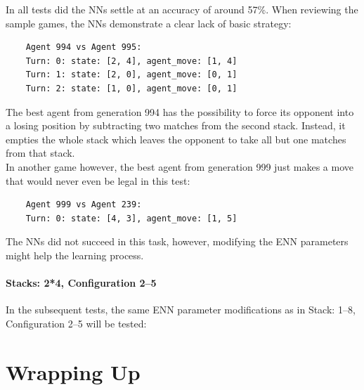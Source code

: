 \documentclass[11pt]{report}
\begin{document}
\begin{enumerate}
    In all tests did the NNs settle at an accuracy of around 57\%.
    When reviewing the sample games, the NNs demonstrate a clear lack of basic strategy:
    \begin{verbatim}
    Agent 994 vs Agent 995:
    Turn: 0: state: [2, 4], agent_move: [1, 4]
    Turn: 1: state: [2, 0], agent_move: [0, 1]
    Turn: 2: state: [1, 0], agent_move: [0, 1]
    \end{verbatim}
    The best agent from generation 994 has the possibility to force its opponent into a losing position by subtracting two matches from the second stack.
    Instead, it empties the whole stack which leaves the opponent to take all but one matches from that stack.
    \\
    In another game however, the best agent from generation 999 just makes a move that would never even be legal in this test:
    \begin{verbatim}
    Agent 999 vs Agent 239:
    Turn: 0: state: [4, 3], agent_move: [1, 5]
    \end{verbatim}
    The NNs did not succeed in this task, however, modifying the ENN parameters might help the learning process.

    \subsubsection{Stacks: 2*4, Configuration 2--5}
    In the subsequent tests, the same ENN parameter modifications as in Stack: 1--8, Configuration 2--5 will be tested:

    \chapter{Wrapping Up}\label{ch:wrapping-up}



\end{enumerate}
\end{document}
